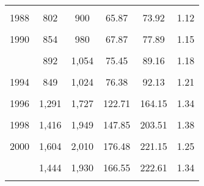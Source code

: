 \documentclass[
]{krantz}
\begin{document}
\begin{longtable}[t]{cccccc}
\endfoot
\bottomrule
\endlastfoot
\cellcolor{gray!6}{1987} & \cellcolor{gray!6}{7} & \cellcolor{gray!6}{10} & \cellcolor{gray!6}{52.24} & \cellcolor{gray!6}{74.63} & \cellcolor{gray!6}{1.43}\\
1988 & 802 & 900 & 65.87 & 73.92 & 1.12\\
\cellcolor{gray!6}{1989} & \cellcolor{gray!6}{735} & \cellcolor{gray!6}{833} & \cellcolor{gray!6}{59.44} & \cellcolor{gray!6}{67.36} & \cellcolor{gray!6}{1.13}\\
1990 & 854 & 980 & 67.87 & 77.89 & 1.15\\
\cellcolor{gray!6}{1991} & \cellcolor{gray!6}{872} & \cellcolor{gray!6}{995} & \cellcolor{gray!6}{73.69} & \cellcolor{gray!6}{84.08} & \cellcolor{gray!6}{1.14}\\
\addlinespace
1992 & 892 & 1,054 & 75.45 & 89.16 & 1.18\\
\cellcolor{gray!6}{1993} & \cellcolor{gray!6}{905} & \cellcolor{gray!6}{1,050} & \cellcolor{gray!6}{78.38} & \cellcolor{gray!6}{90.93} & \cellcolor{gray!6}{1.16}\\
1994 & 849 & 1,024 & 76.38 & 92.13 & 1.21\\
\cellcolor{gray!6}{1995} & \cellcolor{gray!6}{1,002} & \cellcolor{gray!6}{1,257} & \cellcolor{gray!6}{93.84} & \cellcolor{gray!6}{117.72} & \cellcolor{gray!6}{1.25}\\
1996 & 1,291 & 1,727 & 122.71 & 164.15 & 1.34\\
\addlinespace
\cellcolor{gray!6}{1997} & \cellcolor{gray!6}{1,379} & \cellcolor{gray!6}{1,810} & \cellcolor{gray!6}{138.89} & \cellcolor{gray!6}{182.29} & \cellcolor{gray!6}{1.31}\\
1998 & 1,416 & 1,949 & 147.85 & 203.51 & 1.38\\
\cellcolor{gray!6}{1999} & \cellcolor{gray!6}{1,536} & \cellcolor{gray!6}{1,936} & \cellcolor{gray!6}{161.16} & \cellcolor{gray!6}{203.13} & \cellcolor{gray!6}{1.26}\\
2000 & 1,604 & 2,010 & 176.48 & 221.15 & 1.25\\
\cellcolor{gray!6}{2001} & \cellcolor{gray!6}{1,605} & \cellcolor{gray!6}{2,062} & \cellcolor{gray!6}{180.89} & \cellcolor{gray!6}{232.39} & \cellcolor{gray!6}{1.28}\\
\addlinespace
2002 & 1,444 & 1,930 & 166.55 & 222.61 & 1.34\\
\cellcolor{gray!6}{2003} & \cellcolor{gray!6}{1,151} & \cellcolor{gray!6}{1,746} & \cellcolor{gray!6}{134.10} & \cellcolor{gray!6}{203.43} & \cellcolor{gray!6}{1.52}\\

\end{longtable}
\end{document}
